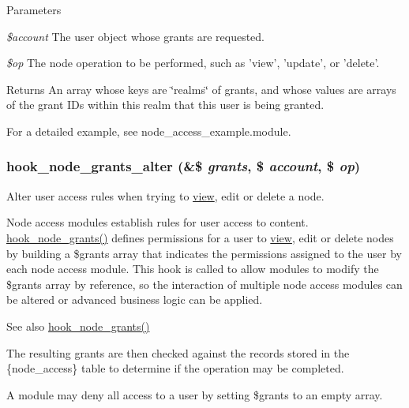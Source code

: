 \begin{DoxyParams}{Parameters}
\item[{\em \$account}]The user object whose grants are requested. \item[{\em \$op}]The node operation to be performed, such as 'view', 'update', or 'delete'.\end{DoxyParams}
\begin{DoxyReturn}{Returns}
An array whose keys are \char`\"{}realms\char`\"{} of grants, and whose values are arrays of the grant IDs within this realm that this user is being granted.
\end{DoxyReturn}
For a detailed example, see node\_\-access\_\-example.module. \hypertarget{group__node__access_ga21e95e2bd0b4ed12d861aa83426a8ba3}{
\subsubsection[{hook\_\-node\_\-grants\_\-alter}]{\setlength{\rightskip}{0pt plus 5cm}hook\_\-node\_\-grants\_\-alter (\&\$ {\em grants}, \/  \$ {\em account}, \/  \$ {\em op})}}
\label{group__node__access_ga21e95e2bd0b4ed12d861aa83426a8ba3}
Alter user access rules when trying to \hyperlink{classview}{view}, edit or delete a node.

Node access modules establish rules for user access to content. \hyperlink{group__node__access_gaa973f2ab6ab14c3fa14e5138c6d69ecf}{hook\_\-node\_\-grants()} defines permissions for a user to \hyperlink{classview}{view}, edit or delete nodes by building a \$grants array that indicates the permissions assigned to the user by each node access module. This hook is called to allow modules to modify the \$grants array by reference, so the interaction of multiple node access modules can be altered or advanced business logic can be applied.

\begin{DoxySeeAlso}{See also}
\hyperlink{group__node__access_gaa973f2ab6ab14c3fa14e5138c6d69ecf}{hook\_\-node\_\-grants()}
\end{DoxySeeAlso}
The resulting grants are then checked against the records stored in the \{node\_\-access\} table to determine if the operation may be completed.

A module may deny all access to a user by setting \$grants to an empty array.


